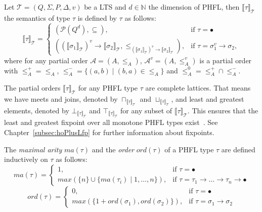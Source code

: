 \begin{definition}
    Let $\mathcal{T} = (Q, \Sigma, P, \Delta, v)$ be a LTS and $d \in \mathbb{N}$ the dimension of PHFL,
    then $\llbracket\tau\rrbracket_\mathcal{T}$ the
    semantics
    of type $\tau$ is defined by $\tau$ as follows:
        \[\llbracket\tau\rrbracket_\mathcal{T}=
        \begin{cases}
            (\mathcal{P}(Q^d), \subseteq),  & \text{if }\tau = \bullet\\
            ((\llbracket\sigma_1\rrbracket_\mathcal{T})^v \rightarrow \llbracket\sigma_2\rrbracket_\mathcal{T}, \leq_{
            (\llbracket\sigma_1\rrbracket_\mathcal{T})^v \rightarrow \llbracket\sigma_2\rrbracket_\mathcal{T}}), &
            \text{if }\tau = \sigma_1^v\rightarrow \sigma_2,
        \end{cases}\]
    where for any partial order $\mathcal{A} = (A, \leq_A)$, $\mathcal{A}^v = (A, \leq_A^v)$ is a partial order
    with $\leq_A^+ = \leq_A$, $\leq_A^- = \{(a, b) \mid (b, a) \in \leq_A\}$ and $\leq_A^0 = \leq_A^+ \cap \leq_A^-$.
\end{definition}

The partial orders $\llbracket\tau\rrbracket_\mathcal{T}$ for any PHFL type $\tau$ are complete lattices. That means we
have meets and joins, denoted by $\sqcap_{\llbracket\tau\rrbracket_\mathcal{T}}$ and
$\sqcup_{\llbracket\tau\rrbracket_\mathcal{T}}$, and least and greatest elements, denoted by
$\bot_{\llbracket\tau\rrbracket_\mathcal{T}}$ and $\top_{\llbracket\tau\rrbracket_\mathcal{T}}$ for any subset of
$\llbracket\tau\rrbracket_\mathcal{T}$. This ensures that the least and greatest fixpoint over all monotone PHFL types
exist~\cite{tarski1955lattice}. See Chapter~\ref{subsec:hoPlusLfp} for further information about fixpoints.

\begin{definition}
    The \emph{maximal arity} $ma(\tau)$ and the \emph{order} $ord(\tau)$ of a PHFL type $\tau$ are defined
    inductively on
    $\tau$ as follows:
\[ma(\tau)=
\begin{cases}
    1, & \text{if }\tau = \bullet\\
    max(\{n\} \cup \{ma(\tau_i)\mid1,\dots,n\}), &
    \text{if }\tau = \tau_1\rightarrow\dots\rightarrow\tau_n\rightarrow\bullet
\end{cases}\]
\[ord(\tau)=
\begin{cases}
    0, & \text{if }\tau = \bullet\\
    max(\{1 + ord(\sigma_1), ord(\sigma_2)\}), & \text{if }\tau = \sigma_1 \rightarrow \sigma_2
\end{cases}\]
\end{definition}

